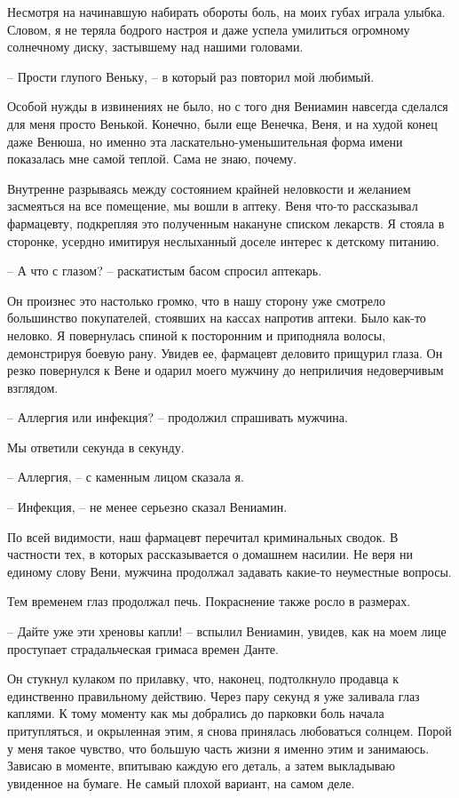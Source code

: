 \documentclass[
]{book}
\begin{document}
Несмотря на начинавшую набирать обороты боль, на моих губах играла улыбка. Словом, я не теряла бодрого настроя и даже успела умилиться огромному солнечному диску, застывшему над нашими головами.

-- Прости глупого Веньку, -- в который раз повторил мой любимый.

Особой нужды в извинениях не было, но с того дня Вениамин навсегда сделался для меня просто Венькой. Конечно, были еще Венечка, Веня, и на худой конец даже Венюша, но именно эта ласкательно-уменьшительная форма имени показалась мне самой теплой. Сама не знаю, почему.

Внутренне разрываясь между состоянием крайней неловкости и желанием засмеяться на все помещение, мы вошли в аптеку. Веня что-то рассказывал фармацевту, подкрепляя это полученным накануне списком лекарств. Я стояла в сторонке, усердно имитируя неслыханный доселе интерес к детскому питанию.

-- А что с глазом? -- раскатистым басом спросил аптекарь.

Он произнес это настолько громко, что в нашу сторону уже смотрело большинство покупателей, стоявших на кассах напротив аптеки. Было как-то неловко. Я повернулась спиной к посторонним и приподняла волосы, демонстрируя боевую рану. Увидев ее, фармацевт деловито прищурил глаза. Он резко повернулся к Вене и одарил моего мужчину до неприличия недоверчивым взглядом.

-- Аллергия или инфекция? -- продолжил спрашивать мужчина.

Мы ответили секунда в секунду.

-- Аллергия, -- с каменным лицом сказала я.

-- Инфекция, -- не менее серьезно сказал Вениамин.

По всей видимости, наш фармацевт перечитал криминальных сводок. В частности тех, в которых рассказывается о домашнем насилии. Не веря ни единому слову Вени, мужчина продолжал задавать какие-то неуместные вопросы.

Тем временем глаз продолжал печь. Покраснение также росло в размерах.

-- Дайте уже эти хреновы капли! -- вспылил Вениамин, увидев, как на моем лице проступает страдальческая гримаса времен Данте.

Он стукнул кулаком по прилавку, что, наконец, подтолкнуло продавца к единственно правильному действию. Через пару секунд я уже заливала глаз каплями. К тому моменту как мы добрались до парковки боль начала притупляться, и окрыленная этим, я снова принялась любоваться солнцем. Порой у меня такое чувство, что большую часть жизни я именно этим и занимаюсь. Зависаю в моменте, впитываю каждую его деталь, а затем выкладываю увиденное на бумаге. Не самый плохой вариант, на самом деле.
\end{document}
